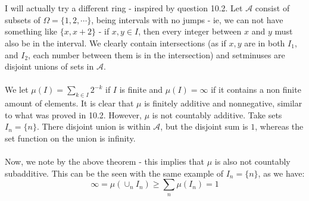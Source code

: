 \documentclass[12pt,a4paper]{article}
\newcommand{\1}[1]{\mathbbm{1}\left\{ #1 \right\}}
\newcommand{\acal}{\mathcal{A}}
\begin{document}
\\\\
I will actually try a different ring - inspired by question 10.2. Let $\acal$ consist of subsets of $\Omega = \{1, 2, \cdots\}$, being intervals with no jumps - ie, we can not have something like $\{x, x + 2\}$ - if $x, y \in I$, then every integer between $x$ and $y$ must also be in the interval. We clearly contain intersections (as if $x,y$ are in both $I_1$, and $I_2$, each number between them is in the intersection) and setminuses are disjoint unions of sets in $\acal$.
\\\\
We let $\mu(I) = \sum_{k \in I} 2^{-k}$ if $I$ is finite and $\mu(I) = \infty$ if it contains a non finite amount of elements. It is clear that $\mu$ is finitely additive and nonnegative, similar to what was proved in 10.2. However, $\mu$ is not countably additive. Take sets $I_n = \{n\}$. There disjoint union is within $\acal$, but the disjoint sum is $1$, whereas the set function on the union is infinity.
\\\\
Now, we note by the above theorem - this implies that $\mu$ is also not countably subadditive. This can be the seen with the same example of $I_n = \{n\}$, as we have:
$$
	\infty = \mu(\cup_n I_n) \geq \sum_n \mu(I_n) = 1
$$
\end{document}
